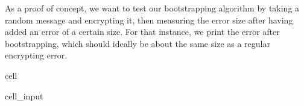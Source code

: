 \documentclass[letterpaper,10pt,english]{jupyterBook}
\begin{document}
\begin{DUlineblock}{0em}
\item[] 
\end{DUlineblock}

\sphinxAtStartPar
As a proof of concept, we want to test our bootstrapping algorithm by taking a random message and encrypting it, then measuring the error size after having added an error of a certain size.
For that instance, we print the error after bootstrapping, which should ideally be about the same size as a regular encrypting error.

\begin{sphinxuseclass}{cell}\begin{sphinxVerbatimInput}

\begin{sphinxuseclass}{cell_input}
\begin{sphinxVerbatim}[commandchars=\\\{\}]
      
     
    
      
    
  \PYG{p}{[}\PYG{p}{[}\PYG{p}{]} \PYG{p}{[}\PYG{p}{]} \PYG{p}{]}

\end{sphinxVerbatim}
\end{sphinxuseclass}
\end{sphinxVerbatimInput}
\end{sphinxuseclass}
\end{document}
